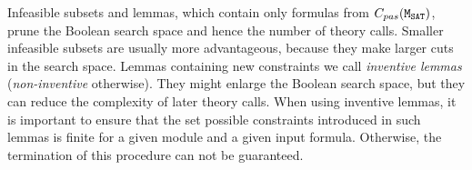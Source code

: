 Infeasible subsets and lemmas, which contain only formulas from 
$C_{pas}(\texttt{M$_\text{SAT}$})$, prune the Boolean search space and hence the number of theory calls. 
Smaller infeasible subsets are usually more advantageous, because they make larger cuts 
in the search space. Lemmas containing new constraints we call
\emph{inventive lemmas} (\emph{non-inventive} otherwise). They might enlarge the 
Boolean search space, but they can reduce the complexity of later theory calls.
When using inventive lemmas, it is important to ensure that the set possible
constraints introduced in such lemmas is finite for a given module and a given 
input formula. Otherwise, the termination of this procedure can not be guaranteed.

